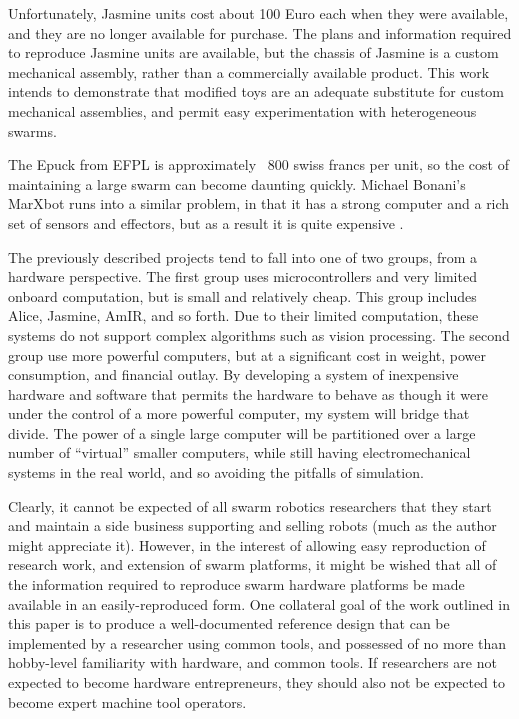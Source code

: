 \documentclass[]{article}
\begin{document}
Unfortunately, Jasmine units cost about 100 Euro each when they were available, and they are no longer available for purchase. 
The plans and information required to reproduce Jasmine units are available, but the chassis of Jasmine is a custom mechanical assembly, rather than a commercially available product. 
This work intends to demonstrate that modified toys are an adequate substitute for custom mechanical assemblies, and permit easy experimentation with heterogeneous swarms. 

The Epuck from EFPL is approximately ~800 swiss francs per unit, so the cost of maintaining a large swarm can become daunting quickly. Michael Bonani's MarXbot runs into a similar problem, in that it has a strong computer and a rich set of sensors and effectors, but as a result it is quite expensive \cite{bonani2010marxbot}. 

The previously described projects tend to fall into one of two groups, from a hardware perspective. 
The first group uses microcontrollers and very limited onboard computation, but is small and relatively cheap.
This group includes Alice, Jasmine, AmIR, and so forth.
Due to their limited computation, these systems do not support complex algorithms such as vision processing. 
The second group use more powerful computers, but at a significant cost in weight, power consumption, and financial outlay.
By developing a system of inexpensive hardware and software that permits the hardware to behave as though it were under the control of a more powerful computer, my system will bridge that divide. 
The power of a single large computer will be partitioned over a large number of ``virtual'' smaller computers, while still having electromechanical systems in the real world, and so avoiding the pitfalls of simulation. 

Clearly, it cannot be expected of all swarm robotics researchers that they start and maintain a side business supporting and selling robots (much as the author might appreciate it).
However, in the interest of allowing easy reproduction of research work, and extension of swarm platforms, it might be wished that all of the information required to reproduce swarm hardware platforms be made available in an easily-reproduced form.
One collateral goal of the work outlined in this paper is to produce a well-documented reference design that can be implemented by a researcher using common tools, and possessed of no more than hobby-level familiarity with hardware, and common tools. 
If researchers are not expected to become hardware entrepreneurs, they should also not be expected to become expert machine tool operators.
\end{document}
